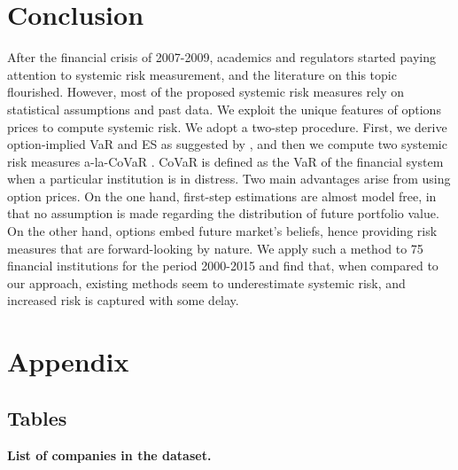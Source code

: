 \documentclass[11pt,a4paper,english]{article}
\begin{document}
\section{Conclusion}
\label{sec: conclusion}
After the financial crisis of 2007-2009, academics and regulators started paying attention to systemic risk measurement, and the literature on this topic flourished. However, most of the proposed systemic risk measures rely on statistical assumptions and past data. We exploit the unique features of options prices to compute systemic risk. We adopt a two-step procedure. First, we derive option-implied VaR and ES as suggested by \citet{GBA16}, and then we compute two systemic risk measures a-la-CoVaR \citep{Adrian2016}. CoVaR is defined as the VaR of the financial system when a particular institution is in distress. Two main advantages arise from using option prices. On the one hand, first-step estimations are almost model free, in that no assumption is made regarding the distribution of future portfolio value. On the other hand, options embed future market's beliefs, hence providing risk measures that are forward-looking by nature. We apply such a method to 75 financial institutions for the period 2000-2015 and find that, when compared to our approach, existing methods seem to underestimate systemic risk, and increased risk is captured with some delay. 




\newpage



\newpage
\section*{Appendix}
\renewcommand{\thesubsection}{\Alph{subsection}}

\subsection{Tables}



\begin{sidewaystable}
	\centering
	\resizebox{0.6\width}{!}{}
	\captionsetup{singlelinecheck=true, font = footnotesize}
	\caption{
		\textbf{List of companies in the dataset.}
	}
	\label{tab: firms77}
\end{sidewaystable}
\end{document}
